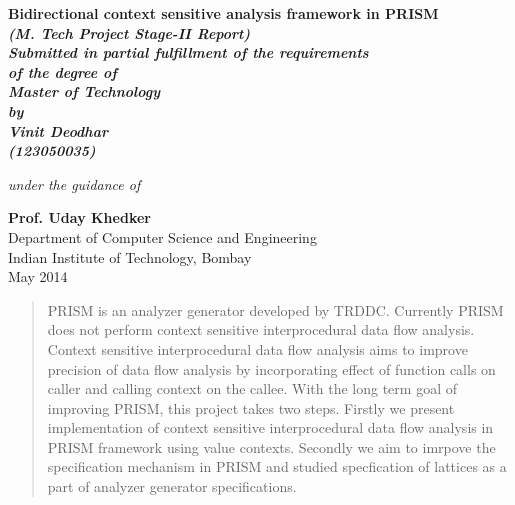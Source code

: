 \documentclass[12pt]{report}
\begin{document}
\begin{titlepage}
\thispagestyle{empty}
\vspace*{0.7cm}
{\centering    
\large
{\Large\bf Bidirectional context sensitive analysis framework in PRISM}\\
\vspace{1cm}
\bf{\textit{(M. Tech Project Stage-II Report)}}\\ 
\vspace{0.75cm}
\it{Submitted in partial fulfillment of the requirements}\\
\vspace{0.5cm}
\it{of the degree of}\\
\vspace{0.5cm}
\bf{Master of Technology}\\
\vspace{0.1cm}
\it
by \\
\vspace{.5cm}
\rm
{\large \bf {Vinit Deodhar}}\\
{\large \bf {(123050035)}}

\vspace{0.75cm}

{\it{under the guidance of}} \\
\vspace{.5cm}

\hspace{.05cm} {\large \bf {Prof. Uday Khedker}}\\
\vspace {0.75cm}
\vspace{0.4cm}
Department of Computer Science and Engineering \\
Indian Institute of Technology, Bombay\\
{\centering
\hspace{5.7cm}May 2014}
}
\pagebreak
\end{titlepage}


\begin{abstract}
PRISM is an analyzer generator developed by TRDDC. Currently PRISM does not perform context sensitive interprocedural data flow analysis. Context sensitive interprocedural data flow analysis aims to improve precision of data flow analysis by incorporating effect of function calls on caller and calling context on the callee. With the long term goal of improving PRISM, this project takes two steps. Firstly we present implementation of context sensitive interprocedural data flow analysis in PRISM framework using value contexts. Secondly we aim to imrpove the specification mechanism in PRISM and studied specfication of lattices as a part of analyzer generator specifications.

\end{abstract}
\end{document}
